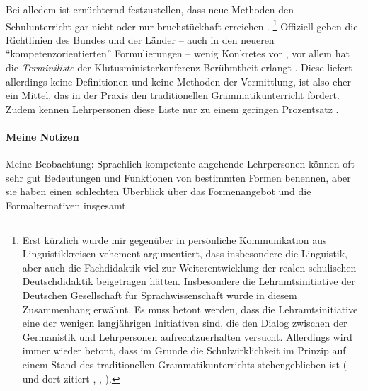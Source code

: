 Bei alledem ist ernüchternd festzustellen, dass neue Methoden den Schulunterricht gar nicht oder nur bruchstückhaft erreichen \citep[243]{Bredel2013}.%
\footnote{Erst kürzlich wurde mir gegenüber in persönliche Kommunikation aus Linguistikkreisen vehement argumentiert, dass insbesondere die Linguistik, aber auch die Fachdidaktik viel zur Weiterentwicklung der realen schulischen Deutschdidaktik beigetragen hätten.
Insbesondere die Lehramtsinitiative der Deutschen Gesellschaft für Sprachwissenschaft wurde in diesem Zusammenhang erwähnt.
Es muss betont werden, dass die Lehramtsinitiative eine der wenigen langjährigen Initiativen sind, die den Dialog zwischen der Germanistik und Lehrpersonen aufrechtzuerhalten versucht.
Allerdings wird immer wieder betont, dass im Grunde die Schulwirklichkeit im Prinzip auf einem Stand des traditionellen Grammatikunterrichts stehengeblieben ist (\zB \citealt[211]{Steets2003} und dort zitiert \citealt[143]{SteinigHuneke2002}, \citealt[243,257]{Bredel2013}, \citealt[2]{KoepckeZiegler2013}).}
Offiziell geben die Richtlinien des Bundes und der Länder -- auch in den neueren "`kompetenzorientierten"' Formulierungen -- wenig Konkretes vor \citep[250--255]{Bredel}, vor allem hat die \textit{Terminiliste} der Klutusministerkonferenz Berühmtheit erlangt \citep[244--249]{Bredel2013}.
Diese liefert allerdings keine Definitionen und keine Methoden der Vermittlung, ist also eher ein Mittel, das in der Praxis den traditionellen Grammatikunterricht fördert.
Zudem kennen Lehrpersonen diese Liste nur zu einem geringen Prozentsatz \citep{Haecker2009}.



\paragraph{Meine Notizen}

Meine Beobachtung: Sprachlich kompetente angehende Lehrpersonen können oft sehr gut Bedeutungen und Funktionen von bestimmten Formen benennen, aber sie haben einen schlechten Überblick über das Formenangebot und die Formalternativen insgesamt.


















